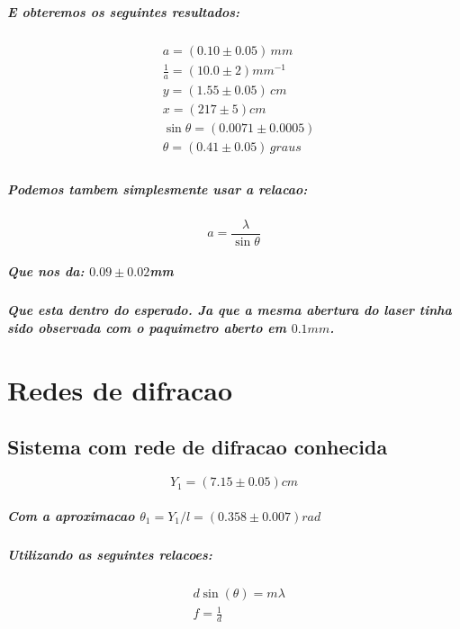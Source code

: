 \documentclass[12pt,twoside, a4paper, twocolumn]{article}
\begin{document}
\subparagraph*{E obteremos os seguintes resultados:}

\begin{equation}
  \begin{aligned}
     & a =(0.10 \pm 0.05)\,mm             \\
     & \frac{1}{a} = (10.0 \pm 2)mm^{-1}  \\
     & y = (1.55 \pm 0.05)\,cm            \\
     & x = (217 \pm 5)cm                  \\
     & \sin{\theta} = (0.0071 \pm 0.0005) \\
     & \theta = (0.41 \pm 0.05)\,graus    \\
  \end{aligned}
\end{equation}

\subparagraph*{Podemos tambem simplesmente usar a relacao:}

\begin{equation}
  a = \frac{\lambda}{\sin{\theta}}
\end{equation}

\subparagraph*{Que nos da: $0.09 \pm 0.02$mm}

\subparagraph*{Que esta dentro do esperado. Ja que a mesma abertura do laser tinha sido observada com o paquimetro aberto em $0.1mm$.}

\newpage

\pagebreak

\section{Redes de difracao}

\subsection{Sistema com rede de difracao conhecida}

\begin{equation}
  Y_1 = (7.15 \pm 0.05)cm
\end{equation}


\subparagraph*{Com a aproximacao $\theta_1 = Y_1/l = (0.358 \pm 0.007)rad$}

\subparagraph*{Utilizando as seguintes relacoes:}

\begin{equation}
  \begin{aligned}
     & d \sin(\theta) = m \lambda \\
     & f = \frac{1}{d}            \\
  \end{aligned}
\end{equation}
\end{document}
